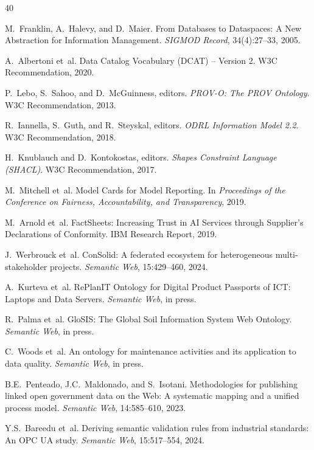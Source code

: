 \documentclass[11pt,a4paper]{article}
\begin{document}

\begin{thebibliography}{40}

 M.~Franklin, A.~Halevy, and D.~Maier. From Databases to Dataspaces: A New Abstraction for Information Management. \emph{SIGMOD Record}, 34(4):27--33, 2005.

 A.~Albertoni et~al. Data Catalog Vocabulary (DCAT) -- Version 2. W3C Recommendation, 2020.

 P.~Lebo, S.~Sahoo, and D.~McGuinness, editors. \emph{PROV-O: The PROV Ontology}. W3C Recommendation, 2013.

 R.~Iannella, S.~Guth, and R.~Steyskal, editors. \emph{ODRL Information Model 2.2}. W3C Recommendation, 2018.

 H.~Knublauch and D.~Kontokostas, editors. \emph{Shapes Constraint Language (SHACL)}. W3C Recommendation, 2017.

 M.~Mitchell et~al. Model Cards for Model Reporting. In \emph{Proceedings of the Conference on Fairness, Accountability, and Transparency}, 2019.

 M.~Arnold et~al. FactSheets: Increasing Trust in AI Services through Supplier's Declarations of Conformity. IBM Research Report, 2019.

 J.~Werbrouck et~al. ConSolid: A federated ecosystem for heterogeneous multi-stakeholder projects. \emph{Semantic Web}, 15:429--460, 2024.

 A.~Kurteva et~al. RePlanIT Ontology for Digital Product Passports of ICT: Laptops and Data Servers. \emph{Semantic Web}, in press.

 R.~Palma et~al. GloSIS: The Global Soil Information System Web Ontology. \emph{Semantic Web}, in press.

 C.~Woods et~al. An ontology for maintenance activities and its application to data quality. \emph{Semantic Web}, in press.

 B.E.~Penteado, J.C.~Maldonado, and S.~Isotani. Methodologies for publishing linked open government data on the Web: A systematic mapping and a unified process model. \emph{Semantic Web}, 14:585--610, 2023.

 Y.S.~Bareedu et~al. Deriving semantic validation rules from industrial standards: An OPC UA study. \emph{Semantic Web}, 15:517--554, 2024.


\end{thebibliography}
\end{document}
